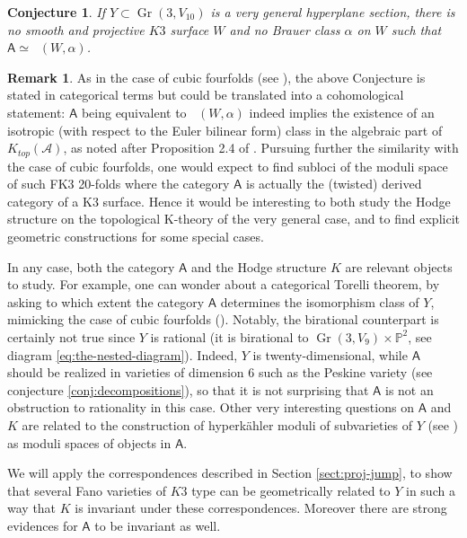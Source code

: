 \documentclass[11pt]{article}
\let\mathcal\mathscr
\theoremstyle{plain}
\newtheorem{conjecture}[theorem]{Conjecture}
\theoremstyle{definition}
\newtheorem{remark}[theorem]{Remark}
\newcommand{\cat}[1]{\mathsf{#1}}
\DeclareMathOperator{\Db}{{\cat{D}^{\mathrm{b}}}}
\DeclareMathOperator{\Gr}{Gr}
\newcommand{\PP}{\mathbb{P}}
\newcommand{\sheaf}[1]{\mathcal{#1}}
\newcommand{\ka}{\sheaf{A}}
\begin{document}
\begin{conjecture}\label{conj:hodgeandD}
If $Y \subset \Gr(3,V_{10})$ is a very general hyperplane section,
there is no smooth and projective $K3$ surface $W$ and no Brauer class $\alpha$ on $W$ such
that $\cat{A} \simeq \Db(W,\alpha)$.
\end{conjecture}

\begin{remark}
As in the case of cubic fourfolds (see \cite{kuz:4fold,at12}), the above Conjecture is stated in
categorical terms but could be translated into a cohomological statement: $\cat{A}$ being equivalent to $\Db(W, \alpha)$
indeed implies the existence of an isotropic (with respect to the Euler bilinear form) class in the algebraic part of $K_{top}(\ka)$,
as noted after Proposition 2.4 of \cite{at12}.
Pursuing further the similarity with the case of cubic fourfolds, one would expect to find subloci of the moduli space of such FK3 20-folds
where the category $\cat{A}$ is actually the (twisted) derived category of a K3 surface. Hence it would be interesting to both
study the Hodge structure on the topological K-theory of the very general case, and to find explicit geometric constructions
for some special cases.
\end{remark}

\vspace*{-5pt}\enlargethispage{.5\baselineskip}%
In any case, both the category $\cat{A}$ and the Hodge structure $K$ are relevant objects to study.
For example, one can wonder about a categorical Torelli theorem, by asking to which extent
the category $\cat{A}$ determines the isomorphism class of $Y$, mimicking the case of
cubic fourfolds (\cite{huybrechts-rennemo,BLMS,Li-Per-Xiao}). Notably, the birational
counterpart is certainly not true since $Y$ is rational (it is birational to $\Gr(3,V_9) \times \PP^2$,
see diagram \eqref{eq:the-nested-diagram}). Indeed, $Y$
is twenty-dimensional, while $\cat{A}$ should be realized in varieties
of dimension $6$ such as the Peskine variety (see conjecture \ref{conj:decompositions}), so that
it is not surprising that $\cat{A}$ is not an obstruction to rationality in this case.
Other very interesting questions on $\cat{A}$ and $K$ are related to the construction of hyperkähler moduli
of subvarieties of $Y$ (see \cite{debarre-voisin}) as moduli spaces of objects in $\cat{A}$.

We will apply the correspondences described in Section \ref{sect:proj-jump}, to show that several Fano varieties of $K3$ type can be geometrically related to $Y$ in such a way that $K$ is invariant under these correspondences. Moreover there are strong evidences for $\cat{A}$ to be invariant as well.
\end{document}

